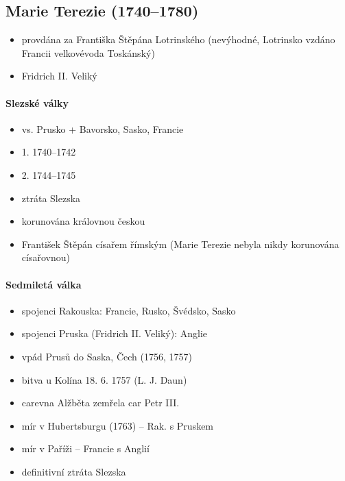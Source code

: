 \subsection{Marie Terezie (1740--1780)}
\begin{itemize}
\item provdána za Františka Štěpána Lotrinského (nevýhodné, Lotrinsko vzdáno Francii \ra velkovévoda Toskánský)
\item Fridrich II. Veliký
\end{itemize}

\paragraph{Slezské války}
\begin{itemize}
\item vs. Prusko + Bavorsko, Sasko, Francie
\item 1. 1740--1742
\item 2. 1744--1745
\item ztráta Slezska 
\item korunována královnou českou
\item František Štěpán císařem římským (Marie Terezie nebyla nikdy korunována císařovnou)
\end{itemize}

\paragraph{Sedmiletá válka}
\begin{itemize}
\item spojenci Rakouska: Francie, Rusko, Švédsko, Sasko
\item spojenci Pruska (Fridrich II. Veliký): Anglie
\item vpád Prusů do Saska, Čech (1756, 1757)
\item bitva u Kolína 18. 6. 1757 (L. J. Daun)
\item carevna Alžběta zemřela \ra car Petr III.
\item mír v Hubertsburgu (1763) -- Rak. s Pruskem
\item mír v Paříži -- Francie s Anglií
\item definitivní ztráta Slezska
\end{itemize}

